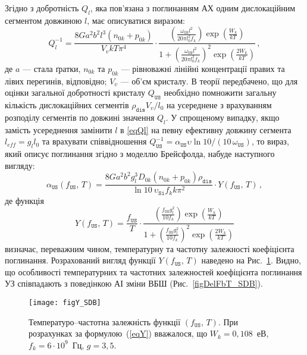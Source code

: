 Згідно з \cite{Brailsford} добротність $Q_l$, яка пов'язана з поглинанням АХ одним дислокаційним сегментом довжиною $l$, має описуватися виразом:
\begin{equation}
\label{eqQl}
Q_l^{-1}=\frac{8Ga^2b^2l^3(n_{0k}+p_{0k})}{V_vkT\pi^4}\cdot
\frac{\left(\frac{\omega_\mathtt{US} l^2}{20\pi l_0^2f_k}\right)\exp{\left(\frac{W_k}{kT}\right)}}
{1+\left(\frac{\omega_\mathtt{US} l^2}{20\pi l_0^2f_k}\right)^2\exp{\left(\frac{2W_k}{kT}\right)}}\,,
\end{equation}
де $a$ --- стала ґратки,
$n_{0k}$ та $p_{0k}$ --- рівноважні лінійні концентрації правих та лівих перегинів, відповідно;
$V_v$ --- об'єм кристалу.
В теорії передбачено, що для оцінки загальної добротності кристалу $Q_\mathtt{US}$ необхідно
помножити загальну кількість дислокаційних сегментів $\rho_\mathtt{dis}V_v/l_0$
на усереднене з врахуванням розподілу сегментів по довжині значення $Q_l$.
У спрощеному випадку, якщо замість усереднення замінити $l$ в \ref{eqQl}
на певну ефективну довжину сегмента \mbox{$l_{eff} = g_l l_0$} та врахувати співвідношення $Q_\mathtt{US}^{-1} = \alpha_\mathtt{US}\upsilon\ln{10}/(10 \,\omega_\mathtt{US})$, то вираз, який описує поглинання згідно з моделлю Брейсфолда, набуде наступного вигляду:
\begin{equation}
\label{eqAlpaBr}
\alpha_\mathtt{US}(f_\mathtt{US},\,T)=\frac{8Ga^2b^2g_l^3D_{0k}(n_{0k}+p_{0k})\rho_\mathtt{dis}}{\ln{10}\:\upsilon_\mathtt{Si} f_k k\pi^2}\cdot Y(f_\mathtt{US},\,T)\,,
\end{equation}
де функція
\begin{equation}
\label{eqY}
Y(f_\mathtt{US},\,T)=\frac{f_\mathtt{US}}{T}\cdot\frac{\left(\frac{f_\mathtt{US} g_l^2}{10 f_k}\right)\exp{\left(\frac{W_k}{kT}\right)}}
{1+\left(\frac{f_\mathtt{US} g_l^2}{10 f_k}\right)^2\exp{\left(\frac{2W_k}{kT}\right)}}
\end{equation}
визначає, переважним чином, температурну та частотну залежності коефіцієнта поглинання.
Розрахований вигляд функції $Y(f_\mathtt{US},\,T)$ наведено на Рис.~\ref{figY_SDB}.
Видно, що особливості температурних та частотних залежностей коефіцієнта поглинання УЗ співпадають
з поведінкою АІ зміни ВБШ (Рис.~\ref{figDelFbT_SDB}).


\begin{figure}
\center
\texttt{[image: figY\_SDB]}
\caption{\label{figY_SDB}
Температуро--частотна залежність функції $(f_\mathtt{US},\,T)$.
При розрахунках за формулою~(\ref{eqY}) вважалося, що
$W_k=0,108$~еВ, $f_k=6\cdot10^9$~Гц, $g=3,5$.
}%
\end{figure}

